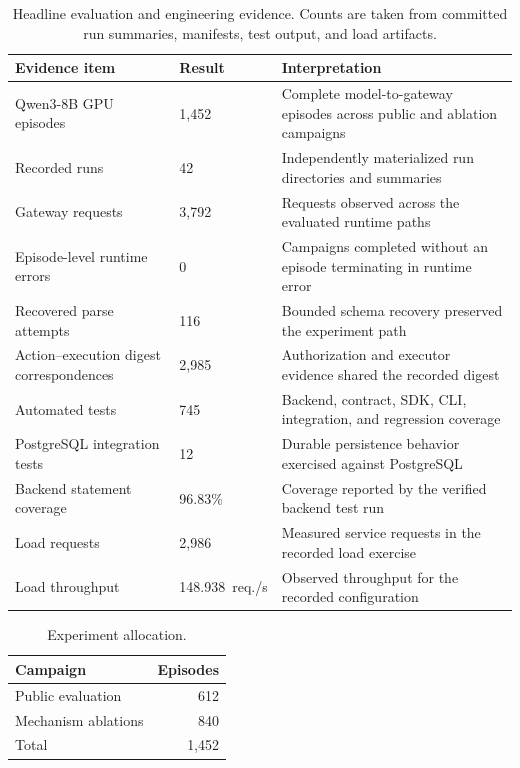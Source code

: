 \documentclass[10pt,twocolumn]{article}
\begin{document}
\begin{table}[t]
\centering
\caption{Headline evaluation and engineering evidence. Counts are taken from committed run summaries, manifests, test output, and load artifacts.}
\label{tab:headline}
\small
\begin{tabularx}{\textwidth}{@{}p{}p{}X@{}}
\toprule
Evidence item & Result & Interpretation \\
\midrule
Qwen3-8B GPU episodes & 1,452 & Complete model-to-gateway episodes across public and ablation campaigns \\
Recorded runs & 42 & Independently materialized run directories and summaries \\
Gateway requests & 3,792 & Requests observed across the evaluated runtime paths \\
Episode-level runtime errors & 0 & Campaigns completed without an episode terminating in runtime error \\
Recovered parse attempts & 116 & Bounded schema recovery preserved the experiment path \\
Action--execution digest correspondences & 2,985 & Authorization and executor evidence shared the recorded digest \\
Automated tests & 745 & Backend, contract, SDK, CLI, integration, and regression coverage \\
PostgreSQL integration tests & 12 & Durable persistence behavior exercised against PostgreSQL \\
Backend statement coverage & 96.83\% & Coverage reported by the verified backend test run \\
Load requests & 2,986 & Measured service requests in the recorded load exercise \\
Load throughput & \mbox{148.938 req./s} & Observed throughput for the recorded configuration \\
\bottomrule
\end{tabularx}
\end{table}

\begin{table}[t]
\centering
\caption{Experiment allocation.}
\label{tab:allocation}
\small
\begin{tabular}{@{}lr@{}}
\toprule
Campaign & Episodes \\
\midrule
Public evaluation & 612 \\
Mechanism ablations & 840 \\
\midrule
Total & 1,452 \\
\bottomrule
\end{tabular}
\end{table}
\end{document}
